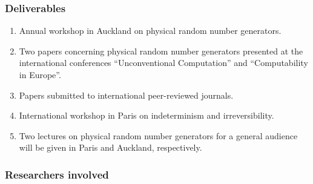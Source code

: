 \documentclass[12pt]{article}
\begin{document}
%


\subsubsection*{Deliverables}


\renewcommand{\labelenumi}{D2.\arabic{enumi}:}
\begin{enumerate}

\item Annual workshop in Auckland on physical random number generators.

\item Two papers concerning  physical random number generators presented at the international conferences ``Unconventional
Computation'' and ``Computability in Europe''.

\item Papers submitted to international peer-reviewed journals.

\item
International workshop  in Paris on indeterminism and irreversibility.

\item Two  lectures on  physical random number generators for a general audience will be given in Paris and Auckland, respectively.
\end{enumerate}


\subsubsection*{Researchers involved}
\end{document}

